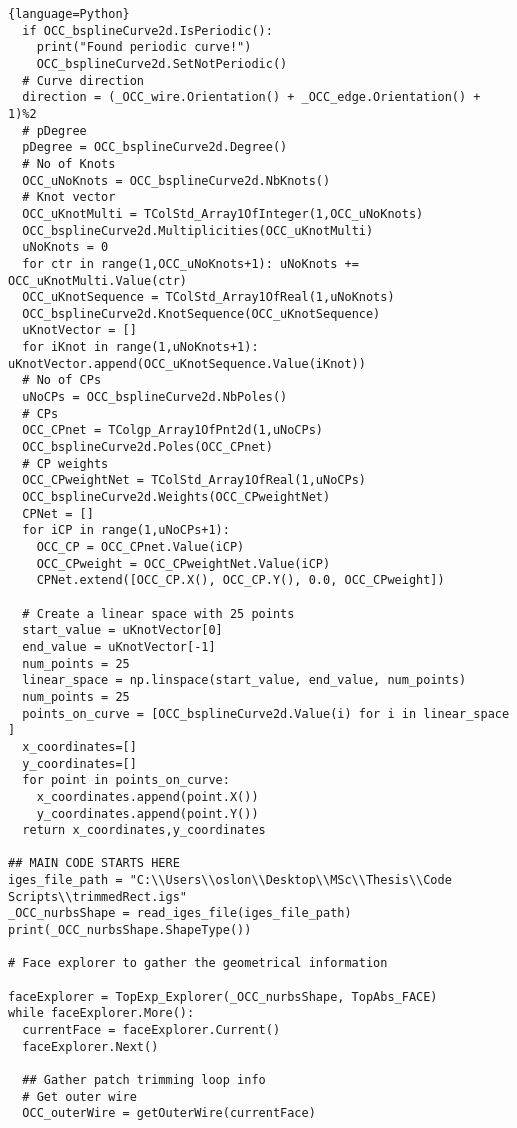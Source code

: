 \begin{adjustwidth}{-0.5cm}{-0.5cm}
\begin{lstlisting}{language=Python}
  if OCC_bsplineCurve2d.IsPeriodic(): 
    print("Found periodic curve!")
    OCC_bsplineCurve2d.SetNotPeriodic()
  # Curve direction 
  direction = (_OCC_wire.Orientation() + _OCC_edge.Orientation() + 1)%2
  # pDegree
  pDegree = OCC_bsplineCurve2d.Degree()
  # No of Knots
  OCC_uNoKnots = OCC_bsplineCurve2d.NbKnots()
  # Knot vector
  OCC_uKnotMulti = TColStd_Array1OfInteger(1,OCC_uNoKnots)
  OCC_bsplineCurve2d.Multiplicities(OCC_uKnotMulti)
  uNoKnots = 0
  for ctr in range(1,OCC_uNoKnots+1): uNoKnots += OCC_uKnotMulti.Value(ctr)
  OCC_uKnotSequence = TColStd_Array1OfReal(1,uNoKnots)
  OCC_bsplineCurve2d.KnotSequence(OCC_uKnotSequence)
  uKnotVector = []
  for iKnot in range(1,uNoKnots+1): uKnotVector.append(OCC_uKnotSequence.Value(iKnot))
  # No of CPs
  uNoCPs = OCC_bsplineCurve2d.NbPoles()
  # CPs
  OCC_CPnet = TColgp_Array1OfPnt2d(1,uNoCPs)
  OCC_bsplineCurve2d.Poles(OCC_CPnet)
  # CP weights
  OCC_CPweightNet = TColStd_Array1OfReal(1,uNoCPs)
  OCC_bsplineCurve2d.Weights(OCC_CPweightNet)
  CPNet = []
  for iCP in range(1,uNoCPs+1):
    OCC_CP = OCC_CPnet.Value(iCP)
    OCC_CPweight = OCC_CPweightNet.Value(iCP)
    CPNet.extend([OCC_CP.X(), OCC_CP.Y(), 0.0, OCC_CPweight])
    
  # Create a linear space with 25 points
  start_value = uKnotVector[0]
  end_value = uKnotVector[-1] 
  num_points = 25
  linear_space = np.linspace(start_value, end_value, num_points)
  num_points = 25
  points_on_curve = [OCC_bsplineCurve2d.Value(i) for i in linear_space ]
  x_coordinates=[]
  y_coordinates=[]
  for point in points_on_curve:
    x_coordinates.append(point.X())
    y_coordinates.append(point.Y()) 
  return x_coordinates,y_coordinates

## MAIN CODE STARTS HERE
iges_file_path = "C:\\Users\\oslon\\Desktop\\MSc\\Thesis\\Code Scripts\\trimmedRect.igs" 
_OCC_nurbsShape = read_iges_file(iges_file_path)
print(_OCC_nurbsShape.ShapeType())

# Face explorer to gather the geometrical information

faceExplorer = TopExp_Explorer(_OCC_nurbsShape, TopAbs_FACE)
while faceExplorer.More():
  currentFace = faceExplorer.Current()
  faceExplorer.Next()

  ## Gather patch trimming loop info
  # Get outer wire
  OCC_outerWire = getOuterWire(currentFace)
  

\end{lstlisting}
\end{adjustwidth}
